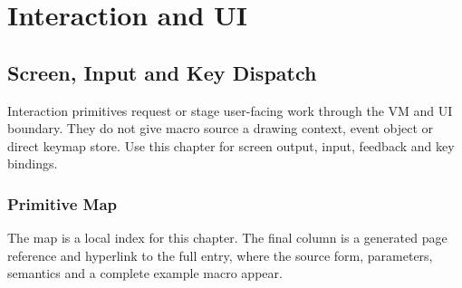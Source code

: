 \documentclass[a4paper,10pt,twoside,openany]{book}
\begin{document}
\part{Interaction and UI}

\chapter{Screen, Input and Key Dispatch}

Interaction primitives request or stage user-facing work through the VM and UI boundary. They do not give macro source a drawing context, event object or direct keymap store. Use this chapter for screen output, input, feedback and key bindings.

\section{Primitive Map}
The map is a local index for this chapter. The final column is a generated page
reference and hyperlink to the full entry, where the source form, parameters,
semantics and a complete example macro appear.
\end{document}
